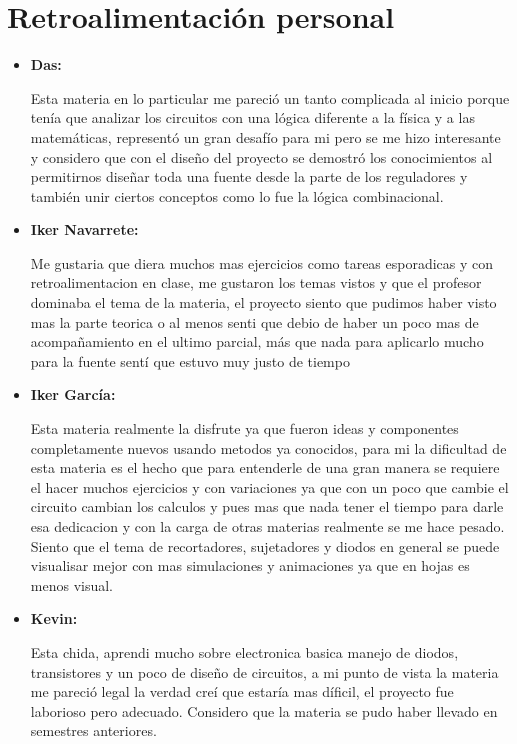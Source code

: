 \documentclass[pdflatex,sn-mathphys-num]{sn-jnl}%
\begin{document}
\section{Retroalimentación personal}
\begin{itemize}
    \item \textbf{Das:}
    
    Esta materia en lo particular me pareció un tanto complicada al inicio porque tenía que analizar los circuitos con una lógica diferente a la física y a las matemáticas, representó un gran desafío para mi pero se me hizo interesante y considero que con el diseño del proyecto se demostró los conocimientos al permitirnos diseñar toda una fuente desde la parte de los reguladores y también unir ciertos conceptos como lo fue la lógica combinacional. 
    \item \textbf{Iker Navarrete:}
    
     Me gustaria que diera muchos mas ejercicios como tareas esporadicas y con retroalimentacion en clase, me gustaron los temas vistos y que el profesor dominaba el tema de la materia, el proyecto siento que pudimos haber visto mas la parte teorica o al menos senti que debio de haber un poco mas de acompañamiento en el ultimo parcial, más que nada para aplicarlo mucho para la fuente sentí que estuvo muy justo de tiempo 

    
    \item \textbf{Iker García:}
    
    Esta materia realmente la disfrute ya que fueron ideas y componentes completamente nuevos usando metodos ya conocidos, para mi la dificultad de esta materia es el hecho que para entenderle de una gran manera se requiere el hacer muchos ejercicios y con variaciones ya que con un poco que cambie el circuito cambian los calculos y pues mas que nada tener el tiempo para darle esa dedicacion y con la carga de otras materias realmente se me hace pesado. Siento que el tema de recortadores, sujetadores y diodos en general se puede visualisar mejor con mas simulaciones y animaciones ya que en hojas es menos visual.
    \item \textbf{Kevin:}
    
    Esta chida, aprendi mucho sobre electronica basica manejo de diodos, transistores y un poco de diseño de circuitos, a mi punto de vista la materia me pareció legal la verdad creí que estaría mas díficil, el proyecto fue laborioso pero adecuado. Considero que la materia se pudo haber llevado en semestres anteriores.
\end{itemize}
\end{document}

